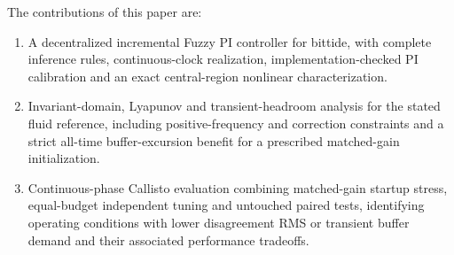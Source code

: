 The contributions of this paper are:
\begin{enumerate}
  \item A decentralized incremental Fuzzy PI controller for bittide,
  with complete inference rules, continuous-clock realization,
  implementation-checked PI calibration and an exact central-region
  nonlinear characterization.
  \item Invariant-domain, Lyapunov and transient-headroom analysis for
  the stated fluid reference, including positive-frequency and
  correction constraints and a strict all-time buffer-excursion
  benefit for a prescribed matched-gain initialization.
  \item Continuous-phase Callisto evaluation combining matched-gain
  startup stress, equal-budget independent tuning and untouched
  paired tests, identifying operating conditions with lower
  disagreement RMS or transient buffer demand and their associated
  performance tradeoffs.
\end{enumerate}



